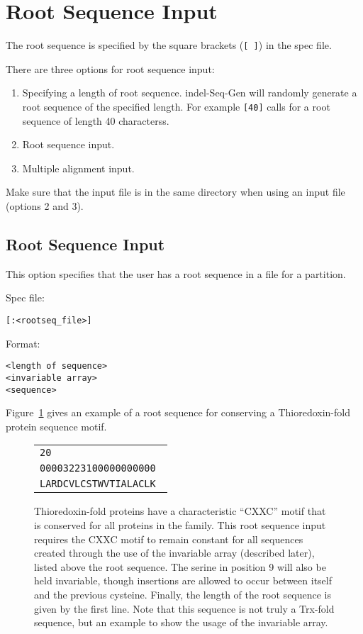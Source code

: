 \documentclass[10pt]{article}
\begin{document}
\section{Root Sequence Input}
\label{sec:root}

The root sequence is specified by the square brackets ({\tt [ ]}) in the spec file.

There are three options for root sequence input:
\begin{enumerate}
\item Specifying a length of root sequence. indel-Seq-Gen will randomly generate a root
sequence of the specified length.  For example {\tt [40]} calls for a root sequence of length
40 characterss.
\item Root sequence input.
\item Multiple alignment input.
\end{enumerate}

Make sure that the input file is in the same directory when using an input file (options 2
and 3).

\subsection{Root Sequence Input}

This option specifies that the user has a root sequence in a file for a partition.

Spec file:
\begin{verbatim}
[:<rootseq_file>]
\end{verbatim}

Format:
\begin{verbatim}
<length of sequence>
<invariable array>
<sequence>
\end{verbatim}

Figure~\ref{fig:trx} gives an example of a root sequence for conserving a Thioredoxin-fold
protein sequence motif.

\begin{figure}[btph]
 \centering
  \begin{tabular}{|l|}
  \hline
  \texttt{20} \\
  \texttt{00003223100000000000 } \\
  \texttt{LARDCVLCSTWVTIALACLK } \\
  \hline
  \end{tabular}
\caption{Thioredoxin-fold proteins have a characteristic ``CXXC'' motif that is conserved for all proteins in the family.  This root sequence input requires the CXXC motif to remain constant for all sequences created through the use of the invariable array (described later), listed above the root sequence. The serine in position 9 will also be held invariable, though insertions are allowed to occur between itself and the previous cysteine.  Finally, the length of the root sequence is given by the first line. Note that this sequence is not truly a Trx-fold sequence, but an example to show the usage of the invariable array.}
\label{fig:trx}
\end{figure}
\end{document}
